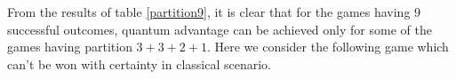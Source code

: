 \documentclass[]{svjour3}
\begin{document}



From the results of table \ref{partition9}, it is clear that for the games having $9$ successful outcomes, quantum advantage can be achieved only for some of the games having partition $3+3+2+1$.
Here we consider the following game which can't be won with certainty in classical scenario.

\begin{table}[htb]
	\begin{center}
		\setlength{\tabcolsep}{0.35em}
	\end{center}
\end{table}
\end{document}
